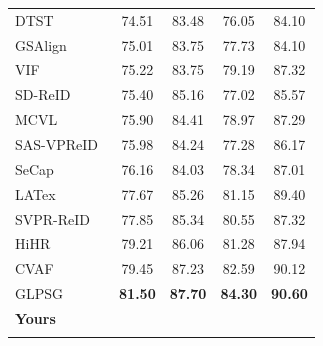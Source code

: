 \documentclass[runningheads]{llncs}
\makeatletter
\let\leaderboards@table\table
\let\leaderboards@endtable\endtable
\renewenvironment{table}[1][]{\leaderboards@table[H]}{\leaderboards@endtable}
\makeatother
\begin{document}
\begin{table}[t]
\begin{tabular}{lcccc}
    DTST~\cite{wang2024dynamic}        & 74.51                               & 83.48                  & 76.05                   & 84.10                  \\
    GSAlign~\cite{li2026gsalign}       & 75.01                               & 83.75                  & 77.73                   & 84.10                  \\
    VIF~\cite{khalid2025bridging}      & 75.22                               & 83.75                  & 79.19                   & 87.32                  \\
    SD-ReID~\cite{wang2026sd}          & 75.40                               & 85.16                  & 77.02                   & 85.57                  \\
    MCVL                               & 75.90                               & 84.41                  & 78.97                   & 87.29                  \\
    SAS-VPReID~\cite{yang2026sas}      & 75.98                               & 84.24                  & 77.28                   & 86.17                  \\
    SeCap~\cite{wang2025secap}         & 76.16                               & 84.03                  & 78.34                   & 87.01                  \\
    LATex~\cite{zhang2025latex}        & 77.67                               & 85.26                  & 81.15                   & 89.40                  \\
    SVPR-ReID~\cite{zheng2026semantic} & 77.85                               & 85.34                  & 80.55                   & 87.32                  \\
    HiHR~\cite{yang2026hihr}           & 79.21                               & 86.06                  & 81.28                   & 87.94                  \\
    CVAF~\cite{mao2026cvaf}            & 79.45                               & 87.23                  & 82.59                   & 90.12                  \\
    GLPSG~\cite{zhu2025global}         & \textbf{81.50}                      & \textbf{87.70}         & \textbf{84.30}          & \textbf{90.60}         \\
    \Xhline{0.6pt}
    \rowcolor{gray!15}
    \textbf{Yours}                     & \textbf{}                           & \textbf{}              & \textbf{}               & \textbf{}              \\
    \Xhline{1.0pt}
  \end{tabular}
\end{table}
\end{document}
